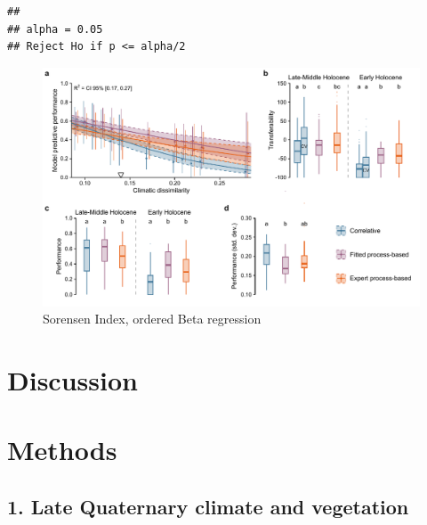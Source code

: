 \documentclass[11pt,]{article}
\begin{document}
\begin{verbatim}
## 
## alpha = 0.05
## Reject Ho if p <= alpha/2
\end{verbatim}

\begin{figure}
\centering
\includegraphics{paper_files/figure-latex/figure_3bis-1.pdf}
\caption{Sorensen Index, ordered Beta regression}
\end{figure}

\hypertarget{discussion}{%
\section{Discussion}\label{discussion}}

\hypertarget{methods}{%
\section{Methods}\label{methods}}

\hypertarget{late-quaternary-climate-and-vegetation}{%
\subsection{1. Late Quaternary climate and
vegetation}\label{late-quaternary-climate-and-vegetation}}
\end{document}
